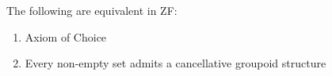 \documentclass[../../main.tex]{subfiles}
\begin{document}
\begin{theorem}\cite{Haj72}\label{main-thm}
    The following are equivalent in ZF:
    \begin{enumerate}
        \item Axiom of Choice
        \item Every non-empty set admits a cancellative groupoid structure
    \end{enumerate}
\end{theorem}
\end{document}
